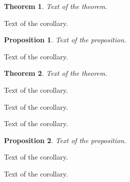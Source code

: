 \documentclass{article}
\newtheorem{theorem}{Theorem}
\newtheorem{proposition}{Proposition}
\begin{document}
\begin{theorem}Text of the theorem.\end{theorem}

\begin{corollary}Text of the corollary.\end{corollary}

\begin{proposition}Text of the proposition.\end{proposition}

\begin{corollary}Text of the corollary.\end{corollary}

\begin{theorem}Text of the theorem.\end{theorem}

\begin{corollary}Text of the corollary.\end{corollary}

\begin{corollary}Text of the corollary.\end{corollary}

\begin{corollary}Text of the corollary.\end{corollary}

\begin{proposition}Text of the proposition.\end{proposition}

\begin{corollary}Text of the corollary.\end{corollary}

\begin{corollary}Text of the corollary.\end{corollary}
\end{document}
